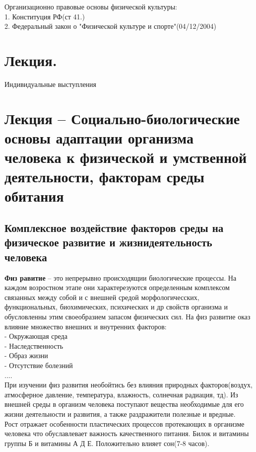 \documentclass[a4paper, 12pt]{article}
\begin{document}
Организационно правовые основы физической культуры:\\
1. Конституция РФ(ст 41.)\\
2. Федеральный закон о "Физической культуре и спорте"(04/12/2004)\\



\newpage
\section{Лекция.  }
Индивидуальные выступления


\section{Лекция -- Социально-биологические основы адаптации организма человека к физической и умственной деятельности, факторам среды обитания}

\subsection{Комплексное воздействие факторов среды на физическое развитие и жизнидеятельность человека}

\textbf{Физ равитие} -- это непрерывно происходящии биологические процессы. На каждом возростном этапе они характерезуются определенным комплексом связанных между собой и с внешней средой морфологичесских, функциональных, биохимических, психических и др свойств организма и обусловленны этим своеобразием запасом физических сил. На физ развитие оказ влияние множество внешних и внутренних факторов:\\
- Окружающая среда\\
- Наследственность\\
- Образ жизни\\
- Отсутствие болезний\\
....\\

При изучении физ развития необойтись без влияния природных факторов(воздух, атмосферное давление, температура, влажность, солнечная радиация, тд). Из внешней среды в организм человека поступают вещества необходимые для его жизни деятельности и развития, а также раздражители полезные и вредные.\\

Рост отражает особенности пластических процессов протекающих в организме человека что обуславлевает важность качественного питания. Билок и витамины группы Б и витамины А Д Е. Положительно влияет сон(7-8 часов). \\
\end{document}
